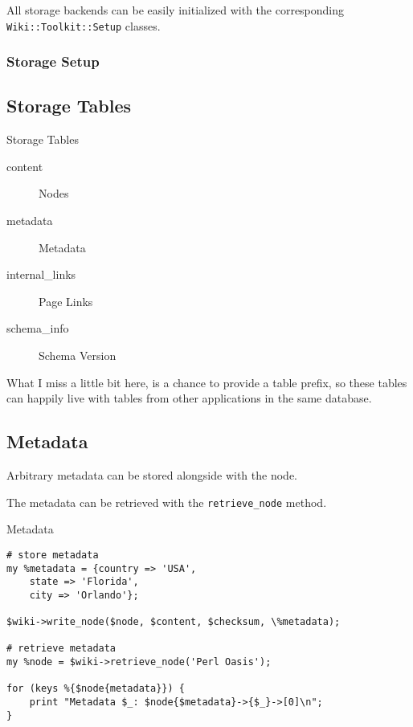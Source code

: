
All storage backends can be easily initialized with the corresponding
\verb+Wiki::Toolkit::Setup+ classes.

\begin{frame}[fragile]
\frametitle{Storage Setup}

\end{frame}

\subsection{Storage Tables}

\begin{frame}{Storage Tables}
 \begin{description}
  \item [content] Nodes
  \item [metadata] Metadata
  \item [internal\_links] Page Links
  \item [schema\_info] Schema Version
 \end{description}
\end{frame}

What I miss a little bit here, is a chance to provide a table prefix,
so these tables can happily live with tables from other applications
in the same database.

\subsection{Metadata}


Arbitrary metadata can be stored alongside with the node.

The metadata can be retrieved with the \verb+retrieve_node+ method.

\begin{frame}[fragile]{Metadata}
\begin{lstlisting}
# store metadata
my %metadata = {country => 'USA', 
    state => 'Florida',
    city => 'Orlando'};

$wiki->write_node($node, $content, $checksum, \%metadata);

# retrieve metadata
my %node = $wiki->retrieve_node('Perl Oasis');

for (keys %{$node{metadata}}) {
    print "Metadata $_: $node{$metadata}->{$_}->[0]\n";
}
\end{lstlisting}
\end{frame}

